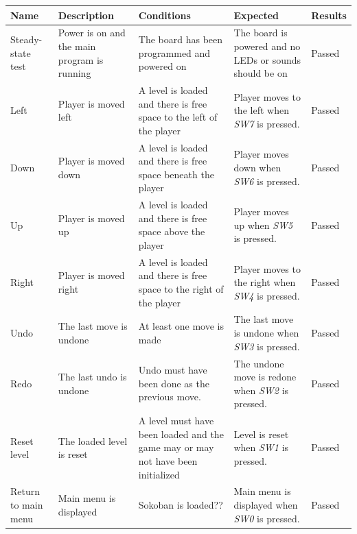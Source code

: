\documentclass[a4paper,11pt]{article}
\renewcommand{\arraystretch}{1.25} %
\begin{document}
\begin{center}
\footnotesize
\renewcommand{\arraystretch}{1.25} %
\begin{tabular}[pos]{|m{45pt}|m{80pt}|m{90pt}|m{105pt}|m{60pt}|}
\hline  \textbf{Name} & \textbf{Description} & \textbf{Conditions} & \textbf{Expected} & \textbf{Results} \\ 

\hline Steady-state test & Power is on and the main program is running & The board has been programmed and powered on & The board is powered and no LEDs or sounds should be on & Passed \\

\hline Left & Player is moved left & A level is loaded and there is free space to the left of the player & Player moves to the left when \emph{SW7} is pressed.  & Passed \\

\hline Down & Player is moved down & A level is loaded and there is free space beneath the player & Player moves down when \emph{SW6} is pressed.  & Passed \\

\hline Up & Player is moved up & A level is loaded and there is free space above the player & Player moves up when \emph{SW5} is pressed.  & Passed \\

\hline Right & Player is moved right & A level is loaded and there is free space to the right of the player & Player moves to the right when \emph{SW4} is pressed.  & Passed \\

\hline Undo & The last move is undone & At least one move is made & The last move is undone when \emph{SW3} is pressed.  & Passed \\

\hline Redo & The last undo is undone & Undo must have been done as the previous move. & The undone move is redone when \emph{SW2} is pressed.  & Passed \\

\hline Reset level & The loaded level is reset & A level must have been loaded and the game may or may not have been initialized & Level is reset when \emph{SW1} is pressed.  & Passed \\

\hline Return to main menu & Main menu is displayed & Sokoban is loaded?? & Main menu is displayed when \emph{SW0} is pressed.  & Passed \\


\hline 
\end{tabular} 
\end{center}
\end{document}
